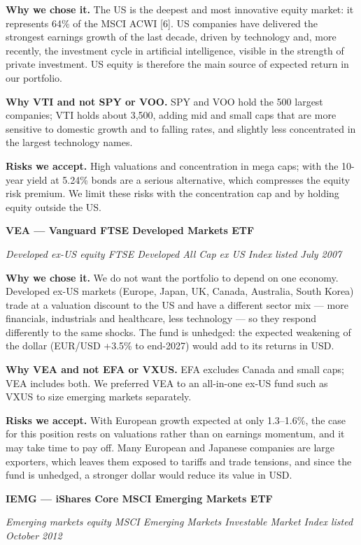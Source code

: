 \documentclass[
]{article}
\begin{document}
\textbf{Why we chose it.} The US is the deepest and most innovative
equity market: it represents 64\% of the MSCI ACWI {[}6{]}. US companies
have delivered the strongest earnings growth of the last decade, driven
by technology and, more recently, the investment cycle in artificial
intelligence, visible in the strength of private investment. US equity
is therefore the main source of expected return in our portfolio.

\textbf{Why VTI and not SPY or VOO.} SPY and VOO hold the 500 largest
companies; VTI holds about 3,500, adding mid and small caps that are
more sensitive to domestic growth and to falling rates, and slightly
less concentrated in the largest technology names.

\textbf{Risks we accept.} High valuations and concentration in mega
caps; with the 10-year yield at 5.24\% bonds are a serious alternative,
which compresses the equity risk premium. We limit these risks with the
concentration cap and by holding equity outside the US.

\textbf{VEA --- Vanguard FTSE Developed Markets ETF}

\emph{Developed ex-US equity \textperiodcentered{} FTSE Developed All Cap ex US Index \textperiodcentered{}
listed July 2007}

\textbf{Why we chose it.} We do not want the portfolio to depend on one
economy. Developed ex-US markets (Europe, Japan, UK, Canada, Australia,
South Korea) trade at a valuation discount to the US and have a
different sector mix --- more financials, industrials and healthcare,
less technology --- so they respond differently to the same shocks. The
fund is unhedged: the expected weakening of the dollar (EUR/USD +3.5\%
to end-2027) would add to its returns in USD.

\textbf{Why VEA and not EFA or VXUS.} EFA excludes Canada and small
caps; VEA includes both. We preferred VEA to an all-in-one ex-US fund
such as VXUS to size emerging markets separately.

\textbf{Risks we accept.} With European growth expected at only
1.3--1.6\%, the case for this position rests on valuations rather than
on earnings momentum, and it may take time to pay off. Many European and
Japanese companies are large exporters, which leaves them exposed to
tariffs and trade tensions, and since the fund is unhedged, a stronger
dollar would reduce its value in USD.

\textbf{IEMG --- iShares Core MSCI Emerging Markets ETF}

\emph{Emerging markets equity \textperiodcentered{} MSCI Emerging Markets Investable Market
Index \textperiodcentered{} listed October 2012}
\end{document}
